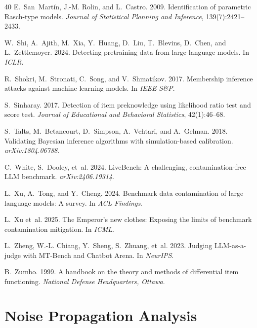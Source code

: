 \documentclass[11pt,a4paper]{article}
\begin{document}
\begin{thebibliography}{40}
E.~San~Mart\'{i}n, J.-M. Rolin, and L.~Castro. 2009. Identification of parametric Rasch-type models. \emph{Journal of Statistical Planning and Inference}, 139(7):2421--2433.

W.~Shi, A.~Ajith, M.~Xia, Y.~Huang, D.~Liu, T.~Blevins, D.~Chen, and L.~Zettlemoyer. 2024. Detecting pretraining data from large language models. In \emph{ICLR}.

R.~Shokri, M.~Stronati, C.~Song, and V.~Shmatikov. 2017. Membership inference attacks against machine learning models. In \emph{IEEE S\&P}.

S.~Sinharay. 2017. Detection of item preknowledge using likelihood ratio test and score test. \emph{Journal of Educational and Behavioral Statistics}, 42(1):46--68.

S.~Talts, M.~Betancourt, D.~Simpson, A.~Vehtari, and A.~Gelman. 2018. Validating Bayesian inference algorithms with simulation-based calibration. \emph{arXiv:1804.06788}.

C.~White, S.~Dooley, et~al. 2024. LiveBench: A challenging, contamination-free LLM benchmark. \emph{arXiv:2406.19314}.

L.~Xu, A.~Tong, and Y.~Cheng. 2024. Benchmark data contamination of large language models: A survey. In \emph{ACL Findings}.

L.~Xu et~al. 2025. The Emperor's new clothes: Exposing the limits of benchmark contamination mitigation. In \emph{ICML}.

L.~Zheng, W.-L. Chiang, Y.~Sheng, S.~Zhuang, et~al. 2023. Judging LLM-as-a-judge with MT-Bench and Chatbot Arena. In \emph{NeurIPS}.

B.~Zumbo. 1999. A handbook on the theory and methods of differential item functioning. \emph{National Defense Headquarters, Ottawa}.

\end{thebibliography}

\appendix
\section{Noise Propagation Analysis}
\label{app:noise}
\end{document}
